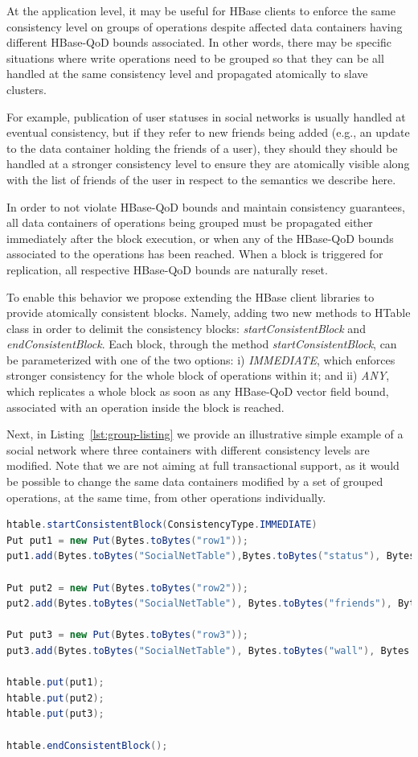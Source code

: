 At the application level, it may be useful for HBase clients to enforce the same consistency level on groups of operations despite affected data containers having different HBase-QoD bounds associated. In other words, there may be specific situations where write operations need to be grouped so that they can be all handled at the same consistency level and propagated atomically to slave clusters.

For example, publication of user statuses in social networks is usually handled at eventual consistency, but if they refer to new friends being added (e.g., an update to the data container holding the friends of a user), they should they should be handled at a stronger consistency level to ensure they are atomically visible along with the list of friends of the user in respect to the semantics we describe here.

In order to not violate HBase-QoD bounds and maintain consistency guarantees, all data containers of operations being grouped must be propagated either immediately after the block execution, or when any of the HBase-QoD bounds associated to the operations has been reached. When a block is triggered for replication, all respective HBase-QoD bounds are naturally reset.

To enable this behavior we propose extending the HBase client libraries to provide atomically consistent blocks.
Namely, adding two new methods to HTable class in order to delimit the consistency blocks: \textit{startConsistentBlock} and \textit{endConsistentBlock}. Each block, through the method \textit{startConsistentBlock}, can be parameterized with one of the two options: i) \textit{IMMEDIATE}, which enforces stronger consistency for the whole block of operations within it; and ii) \textit{ANY}, which replicates a whole block as soon as any HBase-QoD vector field bound, associated with an operation inside the block is reached.

Next, in Listing~\ref{lst:group-listing} we provide an illustrative simple example of a social network where three containers with different consistency levels are modified. Note that we are not aiming at full transactional support, as it would be possible to change the same data containers modified by a set of grouped operations, at the same time, from other operations individually.

\begin{lstlisting}[language={java}, caption={Operation grouping},label={lst:group-listing}]
htable.startConsistentBlock(ConsistencyType.IMMEDIATE)
Put put1 = new Put(Bytes.toBytes("row1"));
put1.add(Bytes.toBytes("SocialNetTable"),Bytes.toBytes("status"), Bytes.toBytes("friend 12345 added"));

Put put2 = new Put(Bytes.toBytes("row2"));
put2.add(Bytes.toBytes("SocialNetTable"), Bytes.toBytes("friends"), Bytes.toBytes("12345"));

Put put3 = new Put(Bytes.toBytes("row3"));
put3.add(Bytes.toBytes("SocialNetTable"), Bytes.toBytes("wall"), Bytes.toBytes("12345 is now a friend"));

htable.put(put1);
htable.put(put2);
htable.put(put3);

htable.endConsistentBlock();
\end{lstlisting}

